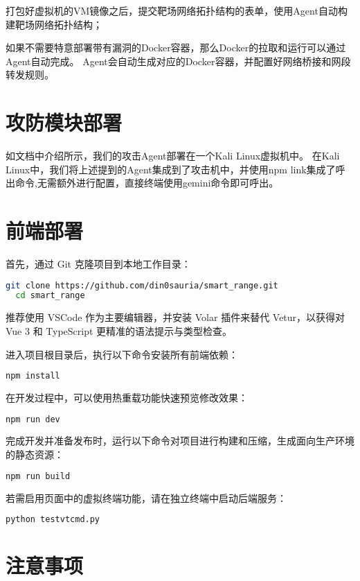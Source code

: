 \documentclass[lang=cn,10pt]{elegantbook}
\begin{document}
打包好虚拟机的VM镜像之后，提交靶场网络拓扑结构的表单，使用Agent自动构建靶场网络拓扑结构；

如果不需要特意部署带有漏洞的Docker容器，那么Docker的拉取和运行可以通过Agent自动完成。
Agent会自动生成对应的Docker容器，并配置好网络桥接和网段转发规则。



\section{攻防模块部署}

如文档中介绍所示，我们的攻击Agent部署在一个Kali Linux虚拟机中。
在Kali Linux中，我们将上述提到的Agent集成到了攻击机中，并使用npm link集成了呼出命令,无需额外进行配置，直接终端使用gemini命令即可呼出。


\section{前端部署}

首先，通过 Git 克隆项目到本地工作目录：
\begin{lstlisting}[language=bash]
  git clone https://github.com/din0sauria/smart_range.git
  cd smart_range
\end{lstlisting}

推荐使用 VSCode 作为主要编辑器，并安装 Volar 插件来替代 Vetur，以获得对 Vue 3 和 TypeScript 更精准的语法提示与类型检查。

进入项目根目录后，执行以下命令安装所有前端依赖：
\begin{lstlisting}[language=bash]
  npm install
\end{lstlisting}

在开发过程中，可以使用热重载功能快速预览修改效果：
\begin{lstlisting}[language=bash]
  npm run dev
\end{lstlisting}

完成开发并准备发布时，运行以下命令对项目进行构建和压缩，生成面向生产环境的静态资源：
\begin{lstlisting}[language=bash]
  npm run build
\end{lstlisting}

若需启用页面中的虚拟终端功能，请在独立终端中启动后端服务：
\begin{lstlisting}[language=bash]
  python testvtcmd.py
\end{lstlisting}





\section{注意事项}
\end{document}
